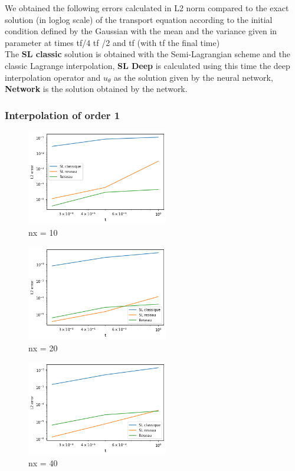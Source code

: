 \documentclass{article}
\begin{document}
We obtained the following errors calculated in L2 norm compared to the exact solution (in loglog scale) of the transport equation according to the initial condition defined by the Gaussian with the mean and the variance given in parameter at times tf/4 tf /2 and tf (with tf the final time)\\


The \textbf{SL classic} solution is obtained with the Semi-Lagrangian scheme and the classic Lagrange interpolation, \textbf{SL Deep} is calculated using this time the deep interpolation operator and $u_\theta $ as the solution given by the neural network, \textbf{Network} is the solution obtained by the network.\\

\subsubsection{Interpolation of order 1}
\newpage

\begin{figure}[!h]
    \centering
    \includegraphics[width=0.55\textwidth]{images/i110.png}
    \caption{nx = 10}
\end{figure}

\begin{figure}[!h]
    \centering
    \includegraphics[width=0.55\textwidth]{images/i120.png}
    \caption{nx = 20}
\end{figure}

\begin{figure}[!h]
    \centering
    \includegraphics[width=0.55\textwidth]{images/i1.png}
    \caption{nx = 40}
\end{figure}
\end{document}
